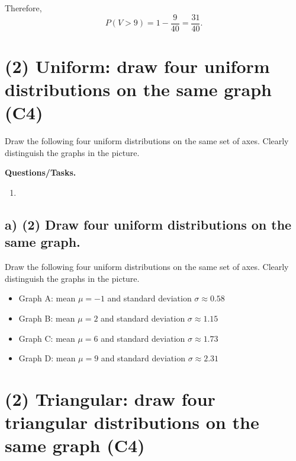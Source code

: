 	Therefore,
	\[
	P(V>9)=1-\frac{9}{40}=\frac{31}{40}.
	\]
	
	
	\section{(2) Uniform: draw four uniform distributions on the same graph (C4)}
	\label{sec:uniform-draw-four-uniform-distributions-c4}
	
	Draw the following four uniform distributions on the same set of axes. Clearly distinguish the graphs in the picture.
	
	\textbf{Questions/Tasks.}
	\begin{enumerate}[label=\textbf{\alph*)}]
		\item {}
	\end{enumerate}
	
	\subsection*{a) \textbf{(2)} Draw four uniform distributions on the same graph.}
	\label{subsec:uniform-draw-four-uniform-distributions-c4-a}
	Draw the following four uniform distributions on the same set of axes. Clearly distinguish the graphs in the picture.
	\begin{itemize}
		\item Graph A: mean $\mu=-1$ and standard deviation $\sigma\approx0.58$
		\item Graph B: mean $\mu=2$ and standard deviation $\sigma\approx1.15$
		\item Graph C: mean $\mu=6$ and standard deviation $\sigma\approx1.73$
		\item Graph D: mean $\mu=9$ and standard deviation $\sigma\approx2.31$
	\end{itemize}
	
	
	\section{(2) Triangular: draw four triangular distributions on the same graph (C4)}
	\label{sec:triangular-draw-four-triangular-distributions-c4}
	
